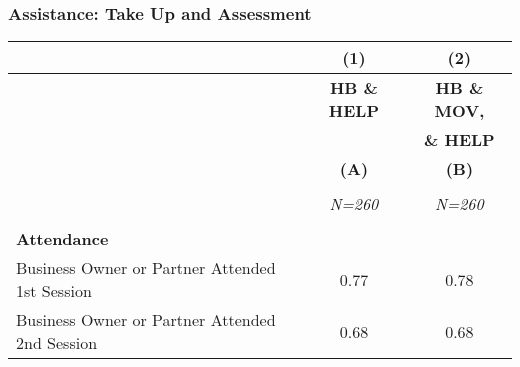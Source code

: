 \documentclass[10pt]{beamer}
\begin{document}
\begin{frame}

\frametitle{Assistance: Take Up and Assessment}
{\scriptsize{\begin{table}[htbp]
  \centering
    \begin{tabular}{lcc}
    \hline
    & (1)   			& (2) 			\\
    \hline
   	& \textbf{HB \& HELP} 		& \textbf{HB \& MOV,}		 \\
  	& 							& \textbf{\& HELP}			 \\
   	& \textbf{(A)}   			& \textbf{(B)}   			\\
	&							&							 \\
   	& \textit{N=260} 			& \textit{N=260} 		\\
    \hline
          																				&       &      \\
    \multicolumn{1}{l}{\textbf{Attendance}} 											&       &        \\
    \multicolumn{1}{l}{    Business Owner or Partner Attended 1st Session} 				& 0.77  & 0.78  \\
    \multicolumn{1}{l}{    Business Owner or Partner Attended 2nd Session} 				& 0.68  & 0.68   \\

\end{tabular}
\end{table}}}
\end{frame}
\end{document}
